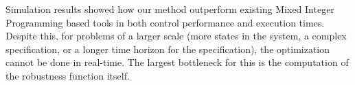  Simulation results showed how our method outperform existing Mixed Integer Programming based tools in both control performance and execution times. Despite this, for problems of a larger scale (more states in the system, a complex specification, or a longer time horizon for the specification), the optimization cannot be done in real-time. The largest bottleneck for this is the computation of the robustness function itself. 